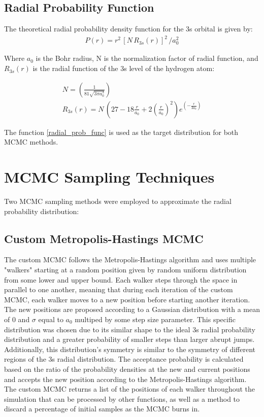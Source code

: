 \documentclass[twocolumn, 11pt]{article}
\begin{document}
\subsection*{Radial Probability Function}
The theoretical radial probability density function for the 3s orbital is given by:
\begin{gather} \label{radial_prob_func}
P(r) = r^2 \,[N\,R_{3s}(r)]^2\, / a_{0} ^2
\end{gather}

Where \( a_0 \) is the Bohr radius, N is the normalization factor of radial function, and \(R_{3s}(r)\) is the radial function of the 3s level of the hydrogen atom:

\begin{gather}
    N = \left( \frac{1}{81 \sqrt{3 \pi a_0^3}} \right) \\
    R_{3s} (r) = N\,\left( 27 - 18 \frac{r}{a_0} + 2 \left( \frac{r}{a_0} \right)^2 \right) e^{\left(-\frac{r}{3a_0}\right)}
\end{gather}

The function \ref{radial_prob_func} is used as the target distribution for both MCMC methods.

\section*{MCMC Sampling Techniques}
Two MCMC sampling methods were employed to approximate the radial probability distribution:

\subsection{Custom Metropolis-Hastings MCMC}
The custom MCMC follows the Metropolis-Hastings algorithm and uses multiple "walkers" starting at a random position given by random uniform distribution from some lower and upper bound. Each walker steps through the space in parallel to one another, meaning that during each iteration of the custom MCMC, each walker moves to a new position before starting another iteration. The new positions are proposed according to a Gaussian distribution with a mean of 0 and $\sigma$ equal to $a_{0}$ multiped by some step size parameter. This specific distribution was chosen due to its similar shape to the ideal 3s radial probability distribution and a greater probability of smaller steps than larger abrupt jumps. Additionally, this distribution's symmetry is similar to the symmetry of different regions of the 3s radial distribution. The acceptance probability is calculated based on the ratio of the probability densities at the new and current positions and accepts the new position according to the Metropolis-Hastings algorithm. The custom MCMC returns a list of the positions of each walker throughout the simulation that can be processed by other functions, as well as a method to discard a percentage of initial samples as the MCMC burns in. 
\end{document}

